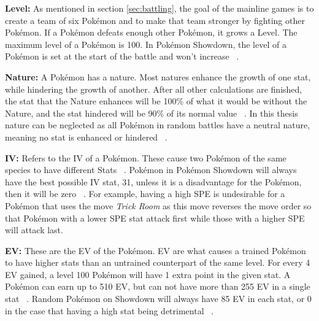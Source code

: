 \textbf{Level:} As mentioned in section \ref{sec:battling}, the goal of the mainline games is to create 
a team of six Pokémon and to make that team stronger by fighting other Pokémon. If a Pokémon defeats
enough other Pokémon, it grows a Level. The maximum level of a Pokémon is 100.
In Pokémon Showdown, the level of  a Pokémon is set at the start of the battle and won't 
increase ~\autocite{Smogon:RandBatsGuide}.

\textbf{Nature:} A Pokémon has a nature. Most natures enhance the growth of one stat, while hindering
the growth of another. After all other calculations are finished, the stat that the Nature enhances will
be 100\% of what it would be without the Nature, and the stat hindered will be 90\% of its normal value
~\autocite{Bulbapedia:Stat}. In this thesis nature can be neglected as all Pokémon in random battles have
a neutral nature, meaning no stat is enhanced or hindered ~\autocite{Smogon:RandBatsGuide}.

\textbf{IV:} Refers to the \ac{IV} of a Pokémon. These cause two Pokémon of the same species to have
different Stats ~\autocite{Bulbapedia:Stat}. Pokémon in Pokémon Showdown will always have the best possible \ac{IV} 
stat, 31, unless it is a disadvantage for the Pokémon, then it will be zero ~\autocite{Smogon:RandBatsGuide}.
For example, having a high \ac{SPE} is undesirable for a Pokémon that uses the move \textit{Trick Room} as this
move reverses the move order so that Pokémon with a lower \ac{SPE} stat attack first while those with a 
higher \ac{SPE} will attack last.

\textbf{EV:} These are the \ac{EV} of the Pokémon. \ac{EV} are what causes a trained Pokémon to have higher
stats than an untrained counterpart of the same level. For every 4 \ac{EV} gained, a level 100 Pokémon 
will have 1 extra point in the given stat. A Pokémon can earn up to 510 \ac{EV}, but can not have more than
255 \ac{EV} in a single stat ~\autocite{Bulbapedia:Stat}. Random Pokémon on Showdown will always have 85 
\ac{EV} in each stat, or 0 in the case that having a high stat being detrimental ~\autocite{Smogon:RandBatsGuide}.

